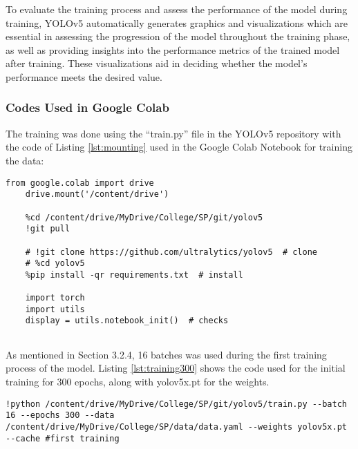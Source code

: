 To evaluate the training process and assess the performance of the model during training, YOLOv5 automatically generates graphics and visualizations which are essential in assessing the progression of the model throughout the training phase, as well as providing insights into the performance metrics of the trained model after training. These visualizations aid in deciding whether the model's performance meets the desired value.

\subsubsection{Codes Used in Google Colab}
The training was done using the “train.py” file in the YOLOv5 repository with the code of Listing \ref{lst:mounting} used in the Google Colab Notebook for training the data:

\begin{lstlisting}[frame=single,label={lst:mounting}, caption=Code to mount Gdrive access to YOLOv5 via cloud]
	from google.colab import drive
	drive.mount('/content/drive')
	
	%cd /content/drive/MyDrive/College/SP/git/yolov5
	!git pull
	
	# !git clone https://github.com/ultralytics/yolov5  # clone
	# %cd yolov5
	%pip install -qr requirements.txt  # install
	
	import torch
	import utils
	display = utils.notebook_init()  # checks
	
\end{lstlisting}
\FloatBarrier

As mentioned in Section 3.2.4, 16 batches was used during the first training process of the model. Listing \ref{lst:training300} shows the code used for the initial training for 300 epochs, along with yolov5x.pt for the weights. 

\begin{lstlisting}[frame=single,label={lst:training300}, caption=Code for the training process (16 batches and 300 epochs using yolov5x.pt pre-trained checkpoint)]
	!python /content/drive/MyDrive/College/SP/git/yolov5/train.py --batch 16 --epochs 300 --data /content/drive/MyDrive/College/SP/data/data.yaml --weights yolov5x.pt --cache #first training
	
\end{lstlisting}
\FloatBarrier

